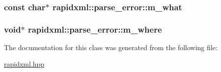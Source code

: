 \subsubsection[{m\+\_\+what}]{\setlength{\rightskip}{0pt plus 5cm}const char$\ast$ rapidxml\+::parse\+\_\+error\+::m\+\_\+what\hspace{0.3cm}{\ttfamily [private]}}\label{classrapidxml_1_1parse__error_a41bffadc72eec238cf4b7d14c10c16ca}
\hypertarget{classrapidxml_1_1parse__error_aa5a164653ac347adddf47b264620d80f}{}
\subsubsection[{m\+\_\+where}]{\setlength{\rightskip}{0pt plus 5cm}void$\ast$ rapidxml\+::parse\+\_\+error\+::m\+\_\+where\hspace{0.3cm}{\ttfamily [private]}}\label{classrapidxml_1_1parse__error_aa5a164653ac347adddf47b264620d80f}


The documentation for this class was generated from the following file\+:\begin{DoxyCompactItemize}
\item 
\hyperlink{rapidxml_8hpp}{rapidxml.\+hpp}\end{DoxyCompactItemize}
